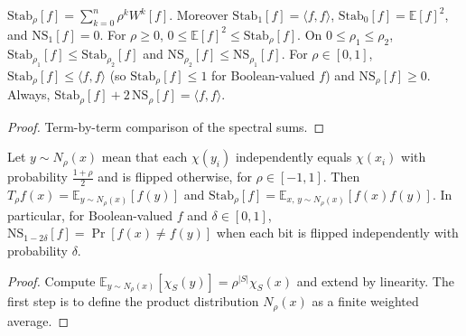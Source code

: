 \begin{proposition}
  \label{prop:analysis-noise-stability}
  \leanok
  $\mathrm{Stab}_\rho[f] = \sum_{k=0}^n \rho^k W^k[f]$. Moreover
  $\mathrm{Stab}_1[f] = \langle f, f \rangle$,
  $\mathrm{Stab}_0[f] = \mathbb{E}[f]^2$, and $\mathrm{NS}_1[f] = 0$. For
  $\rho \ge 0$, $0 \le \mathbb{E}[f]^2 \le \mathrm{Stab}_\rho[f]$. On
  $0 \le \rho_1 \le \rho_2$,
  $\mathrm{Stab}_{\rho_1}[f] \le \mathrm{Stab}_{\rho_2}[f]$ and
  $\mathrm{NS}_{\rho_2}[f] \le \mathrm{NS}_{\rho_1}[f]$. For
  $\rho \in [0,1]$, $\mathrm{Stab}_\rho[f] \le \langle f, f \rangle$ (so
  $\mathrm{Stab}_\rho[f] \le 1$ for Boolean-valued $f$) and
  $\mathrm{NS}_\rho[f] \ge 0$. Always,
  $\mathrm{Stab}_\rho[f] + 2\,\mathrm{NS}_\rho[f] = \langle f, f \rangle$.
\end{proposition}
\begin{proof}
  \leanok
  Term-by-term comparison of the spectral sums.
\end{proof}

\begin{proposition}
  \label{prop:analysis-noise-correlated}
  \notready
  Let $y \sim N_\rho(x)$ mean that each $\chi(y_i)$ independently equals
  $\chi(x_i)$ with probability $\frac{1+\rho}{2}$ and is flipped otherwise, for
  $\rho \in [-1,1]$. Then $T_\rho f(x) = \mathbb{E}_{y \sim N_\rho(x)}[f(y)]$
  and $\mathrm{Stab}_\rho[f] = \mathbb{E}_{x,\, y \sim N_\rho(x)}[f(x) f(y)]$.
  In particular, for Boolean-valued $f$ and $\delta \in [0,1]$,
  $\mathrm{NS}_{1-2\delta}[f] = \Pr[f(x) \neq f(y)]$ when each bit is flipped
  independently with probability $\delta$.
\end{proposition}
\begin{proof}
  Compute $\mathbb{E}_{y \sim N_\rho(x)}[\chi_S(y)] = \rho^{|S|}\chi_S(x)$ and
  extend by linearity. The first step is to define the product distribution
  $N_\rho(x)$ as a finite weighted average.
\end{proof}

